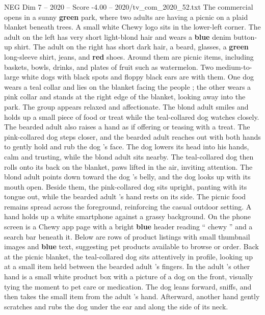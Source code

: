 \begin{textsample}{NEG Dim 7 – 2020 – Score -4.00 – 2020/tv\_com\_2020\_52.txt}  \label{ex:f7_neg_011}
The commercial opens in a sunny \textbf{green} park, where two adults are having a picnic on a plaid blanket beneath trees.
A small white Chewy logo sits in the lower-left corner.
The adult on the left has very short light-blond hair and wears a \textbf{blue} denim button-up shirt.
The adult on the right has short dark hair, a beard, glasses, a \textbf{green} long-sleeve shirt, jeans, and \textbf{red} shoes.
Around them are picnic items, including baskets, bowls, drinks, and plates of fruit such as watermelon.
Two medium-to-large white dogs with black spots and floppy black ears are with them.
One dog wears a teal collar and lies on the blanket facing the people ; the other wears a pink collar and stands at the right edge of the blanket, looking away into the park.
The group appears relaxed and affectionate.
The blond adult smiles and holds up a small piece of food or treat while the teal-collared dog watches closely.
The bearded adult also raises a hand as if offering or teasing with a treat.
The pink-collared dog steps closer, and the bearded adult reaches out with both hands to gently hold and rub the dog ’s face.
The dog lowers its head into his hands, calm and trusting, while the blond adult sits nearby.
The teal-collared dog then rolls onto its back on the blanket, paws lifted in the air, inviting attention.
The blond adult points down toward the dog ’s belly, and the dog looks up with its mouth open.
Beside them, the pink-collared dog sits upright, panting with its tongue out, while the bearded adult ’s hand rests on its side.
The picnic food remains spread across the foreground, reinforcing the casual outdoor setting.
A hand holds up a white smartphone against a grassy background.
On the phone screen is a Chewy app page with a bright \textbf{blue} header reading “ chewy ” and a search bar beneath it.
Below are rows of product listings with small thumbnail images and \textbf{blue} text, suggesting pet products available to browse or order.
Back at the picnic blanket, the teal-collared dog sits attentively in profile, looking up at a small item held between the bearded adult ’s fingers.
In the adult ’s other hand is a small white product box with a picture of a dog on the front, visually tying the moment to pet care or medication.
The dog leans forward, sniffs, and then takes the small item from the adult ’s hand.
Afterward, another hand gently scratches and rubs the dog under the ear and along the side of its neck.

\end{textsample}

